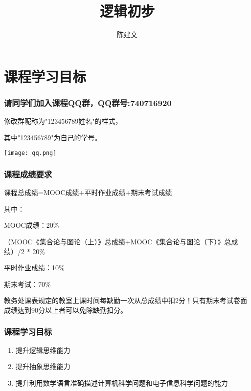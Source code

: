 \documentclass{beamer}
\begin{document}
\begin{CJK*}{UTF8}{gbsn}

\newtheorem{Thm}{定理}[section]
\theoremstyle{definition}
\newtheorem{Def}{定义}[section]
\theoremstyle{example}
\newtheorem*{Ex}{例：}
\newtheorem{Exercise}{习题}

\date{}
\author{陈建文}

\title{逻辑初步}
\begin{frame}
  \titlepage
\end{frame}  
\section{课程学习目标}
\begin{frame}
  \frametitle{请同学们加入课程QQ群，QQ群号:740716920}
  修改群昵称为"123456789姓名"的样式，
  
  其中"123456789"为自己的学号。

  \texttt{[image: qq.png]}
\end{frame}
\begin{frame}
  \frametitle{课程成绩要求}

  课程总成绩=MOOC成绩+平时作业成绩+期末考试成绩

其中：

MOOC成绩：20\%

（MOOC《集合论与图论（上）》总成绩+MOOC《集合论与图论（下）》总成绩）/2 * 20\%


平时作业成绩：10\%


期末考试：70\%


教务处课表规定的教室上课时间每缺勤一次从总成绩中扣2分！只有期末考试卷面成绩达到90分以上者可以免除缺勤扣分。
\end{frame}
\begin{frame}
  \frametitle{课程学习目标}
\begin{enumerate}
\item 提升逻辑思维能力
\item 提升抽象思维能力
\item 提升利用数学语言准确描述计算机科学问题和电子信息科学问题的能力
\end{enumerate}


\end{frame}
\end{CJK*}
\end{document}
